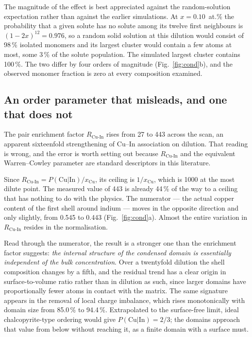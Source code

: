 \documentclass[11pt,a4paper]{article}
\newcommand{\RCuIn}{R_{\mathrm{Cu\text{-}In}}}
\begin{document}
The magnitude of the effect is best appreciated against the random-solution
expectation rather than against the earlier simulations. At
$x = 0.10$~at.\% the probability that a given solute has no solute among its
twelve first neighbours is $(1-2x)^{12} = 0.976$, so a random solid solution at
this dilution would consist of 98\,\% isolated monomers and its largest cluster
would contain a few atoms at most, some 3\,\% of the solute population. The
simulated largest cluster contains 100\,\%. The two differ by four orders of
magnitude (Fig.~\ref{fig:cond}b), and the observed monomer fraction is zero at
every composition examined.

\subsection{An order parameter that misleads, and one that does not}
\label{sec:orderparamresult}

The pair enrichment factor $\RCuIn$ rises from 27 to 443 across the scan, an
apparent sixteenfold strengthening of Cu--In association on dilution. That
reading is wrong, and the error is worth setting out because $\RCuIn$ and the
equivalent Warren--Cowley parameter are standard descriptors in this literature.

Since $\RCuIn = P(\mathrm{Cu}|\mathrm{In})/x_{\mathrm{Cu}}$, its ceiling is
$1/x_{\mathrm{Cu}}$, which is 1000 at the most dilute point. The measured value
of 443 is already 44\,\% of the way to a ceiling that has nothing to do with the
physics. The numerator --- the actual copper content of the first shell around
indium --- moves in the opposite direction and only slightly, from 0.545 to 0.443
(Fig.~\ref{fig:cond}a). Almost the entire variation in $\RCuIn$ resides in the
normalisation.

Read through the numerator, the result is a stronger one than the enrichment
factor suggests: \emph{the internal structure of the condensed domain is
essentially independent of the bulk concentration}. Over a twentyfold dilution
the shell composition changes by a fifth, and the residual trend has a clear
origin in surface-to-volume ratio rather than in dilution as such, since larger
domains have proportionally fewer atoms in contact with the matrix. The same
signature appears in the removal of local charge imbalance, which rises
monotonically with domain size from 85.0\,\% to 94.4\,\%. Extrapolated to the
surface-free limit, ideal chalcopyrite-type ordering would give
$P(\mathrm{Cu}|\mathrm{In}) = 2/3$; the domains approach that value from below
without reaching it, as a finite domain with a surface must.
\end{document}
